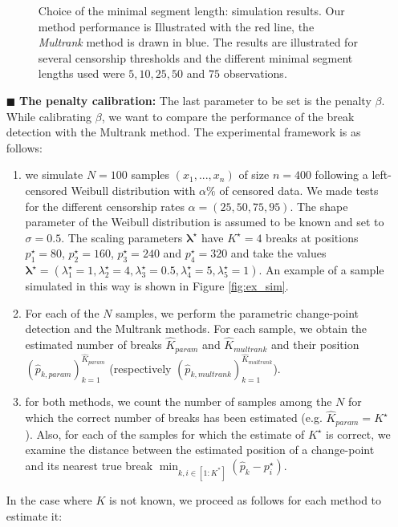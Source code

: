 \begin{itemize}
\begin{figure}[ht]
    \caption{Choice of the minimal segment length: simulation results. Our method performance is Illustrated with the red line, the \textit{Multrank} method is drawn in blue. The results are illustrated for several censorship thresholds and the different minimal segment lengths used were $5,10,25,50$ and $75$ observations.}
    \label{fig:sim_minseg}
\end{figure}
    \item[$\blacksquare$] \textbf{The penalty calibration:} The last parameter to be set is the penalty $\beta$. While calibrating $\beta$, we want to compare the performance of the break detection with the Multrank method. The experimental framework is as follows: 
    \begin{enumerate}
        \item we simulate $N=100$ samples $(x_1,...,x_n)$ of size $n=400$  following a left-censored Weibull distribution with $\alpha\%$ of censored data. We made tests for the different censorship rates $\alpha = (25,50,75,95)$. The shape parameter of the Weibull distribution is assumed to be known and set to $\sigma=0.5$. The scaling parameters $\bm{\lambda^\star}$ have $K^\star=4$ breaks at positions $p^\star_1 = 80$, $p^\star_2 = 160$, $p^\star_3 = 240$ and $p^\star_4 = 320$ and take the values $\bm{\lambda^\star}=(\lambda^\star_1 = 1, \lambda^\star_2 = 4, \lambda^\star_3 = 0.5, \lambda^\star_4 = 5, \lambda^\star_5 = 1)$. An example of a sample simulated in this way is shown in Figure \ref{fig:ex_sim}.
        \item For each of the $N$ samples, we perform the parametric change-point detection and the Multrank methods. For each sample, we obtain the estimated number of breaks $\hat K_{param}$ and $\hat K_{multrank}$ and their position $(\hat{p}_{k,param})_{k = 1}^{\hat K_{param}}$ (respectively $(\hat{p}_{k,multrank})_{k = 1}^{\hat K_{multrank}}$).
        \item for both methods, we count the number of samples among the $N$ for which the correct number of breaks has been estimated (e.g. $\hat K_{param} = K^\star$). Also, for each of the samples for which the estimate of $K^\star$ is correct, we examine the distance between the estimated position of a change-point and its nearest true break $\min_{k,i \in [1:K^*]}(\hat{p}_{k} - p^\star_i)$. 
    \end{enumerate}
    In the case where $K$ is not known, we proceed as follows for each method to estimate it:
    \begin{itemize}

\end{itemize}
\end{itemize}
